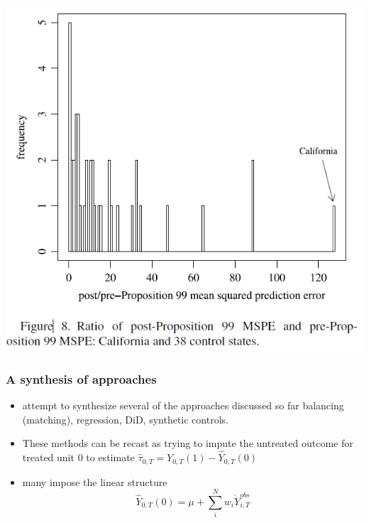 \begin{frame}
  \frametitle{}
  \begin{center}
    \includegraphics[height=.9\textheight]{./resources/ADHPredictionErrors}
  \end{center}  
\end{frame}


\begin{frame}
  \frametitle{A synthesis of approaches}
  \begin{itemize}
    \item \citet{DoudchenkoImbensSynth} attempt to synthesize several of the approaches discussed so far balancing (matching), regression, DiD, synthetic controls. 
    \item These methods can be recast as trying to impute the untreated outcome for treated unit $0$ to estimate $\hat \tau_{0,T} = Y_{0,T}(1) - \hat Y_{0,T}(0)$
    \item many impose the linear structure $$ \hat Y_{0,T}(0) = \mu + \sum_{i}^{N}w_i \dot Y_{i,T}^{obs} $$
  \end{itemize}
\end{frame}
    

